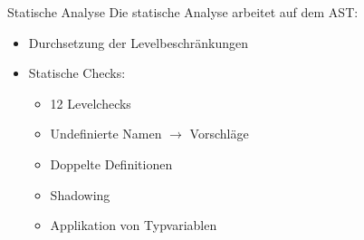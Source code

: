 \begin{frame}{Statische Analyse}
	Die statische Analyse arbeitet auf dem AST:
	\begin{itemize}
		\item Durchsetzung der Levelbeschränkungen
		\item Statische Checks:
		\begin{itemize}
			\item 12 Levelchecks
			\item Undefinierte Namen $\rightarrow$ Vorschläge
			\item Doppelte Definitionen
			\item Shadowing
			\item Applikation von Typvariablen
		\end{itemize}
	\end{itemize}
\end{frame}